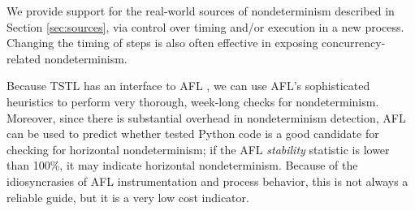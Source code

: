 \begin{comment}
 Tables \ref{tab:methods}
and \ref{tab:options} show, respectively, the primary additions to the
TSTL Python API and the TSTL command line tools; in addition to
horizontal nondeterminism checking, these extensions also support failure
nondeterminism and probabilistic delta-debugging.  The TSTL test
generation tool is called {\tt rt}, since the default mode is a fast
pure Random Tester, and {\tt reduce} is TSTL's tool for
delta-debugging and test
normalization (more aggressive reduction that also tends to ease
debugging and test triage by making tests failing due to the same
fault more similar \cite{onetest}).  With these additions,
developers of TSTL-based testing tools, or developers using TSTL tools
to test code can easily add nondeterminism to the set of properties
checked.  It is even possible to write a TSTL harness that
automatically checks itself for nondeterminism, even if the random
tester is not run with {\tt --checkDeterminism}, simply by adding:

{\scriptsize
\begin{code}
property: not self.nondeterministic(self.test())
\end{code}
}

\noindent to the harness; in fact, by removing the {\tt not}, a test harness can
even specify that behavior should not be deterministic, a property of
possible use in some security-related libraries.

\end{comment}

We provide support for the real-world sources of
nondeterminism described in Section \ref{sec:sources}, via
control over timing and/or execution in a new process.  Changing the timing of
steps is also often effective in exposing concurrency-related
nondeterminism.

Because TSTL has an interface to AFL \cite{aflfuzz}, we can use
AFL's sophisticated heuristics to perform very thorough, week-long
checks for nondeterminism.  Moreover, since
there is substantial overhead in nondeterminism detection, AFL can be
used to predict whether tested Python code is a good candidate for
checking for horizontal nondeterminism; if the
AFL \emph{stability} statistic \cite{aflfuzz} is lower than 100\%, it may indicate horizontal
nondeterminism.
Because of the idiosyncrasies of AFL instrumentation and process
behavior, this is not always a reliable guide, but it is a very low
cost indicator.



